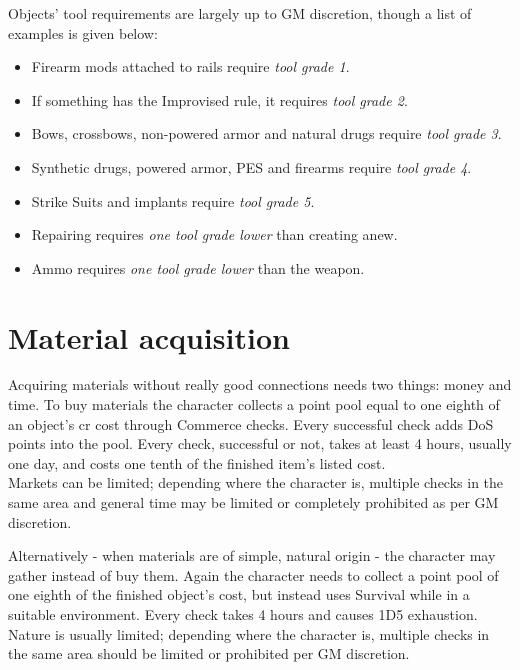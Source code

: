 \documentclass[12pt,a4paper,openany]{book}
\begin{document}
	Objects’ tool requirements are largely up to GM discretion, though a list of examples is given below:
	\begin{itemize}
		\setlength\itemsep{-8mm}
		\item Firearm mods attached to rails require \emph{tool grade 1}.
		\item If something has the Improvised rule, it requires \emph{tool grade 2}.
		\item Bows, crossbows, non-powered armor and natural drugs require \emph{tool grade 3}.
		\item Synthetic drugs, powered armor, PES and firearms require \emph{tool grade 4}.
		\item Strike Suits and implants require \emph{tool grade 5}.
		\item Repairing requires \emph{one tool grade lower} than creating anew.
		\item Ammo requires \emph{one tool grade lower} than the weapon.
	\end{itemize}
	
	\chapter{Material acquisition}
	Acquiring materials without really good connections needs two things: money and time. To buy materials the character collects a point pool equal to one eighth of an object’s cr cost through Commerce checks. Every successful check adds DoS points into the pool. Every check, successful or not, takes at least 4 hours, usually one day, and costs one tenth of the finished item’s listed cost.\\
	Markets can be limited; depending where the character is, multiple checks in the same area and general time may be limited or completely prohibited as per GM discretion. \par
	Alternatively - when materials are of simple, natural origin - the character may gather instead of buy them. Again the character needs to collect a point pool of one eighth of the finished object's cost, but instead uses Survival while in a suitable environment. Every check takes 4 hours and causes 1D5 exhaustion.\\
	Nature is usually limited; depending where the character is, multiple checks in the same area should be limited or prohibited per GM discretion.
\end{document}
